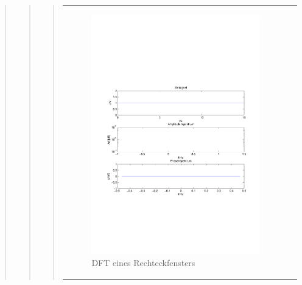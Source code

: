 \begin{quote}
\begin{quote}
\begin{quote}
\begin{center}
\begin{tabular}{ll}
\begin{minipage}{0.6\textwidth}
                        \begin{figure}[H]
                            \label{fig:}
                            \includegraphics[scale=0.5, trim = 1.5cm 7cm 1.5cm 8cm, clip]{./Bilder/RechteckDFT}
                            \caption{DFT eines Rechteckfensters}
                        \end{figure}
    
                    \end{minipage}
                    \begin{minipage}{0.6\textwidth}
    

\end{minipage}
\end{tabular}
\end{center}
\end{quote}
\end{quote}
\end{quote}
